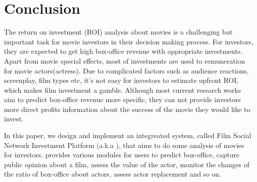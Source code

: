 \section{Conclusion}
\label{sec:conclu}
The return on investment (ROI) analysis about movies is a challenging but important task for movie investors in their decision making process. For investors, they are expected to get high box-office revenue with appropriate investments. Apart from movie special effects, most of investments are used to remuneration for movie actors(actress). Due to complicated factors such as audience reactions, screenplay, film types etc, it's not easy for investors to estimate upfront ROI, which makes film investment a gamble. Although most current research works aim to predict box-office revenue more specific, they can not provide investors more direct profits information about the success of the movie they would like to invest.
\par In this paper, we design and implement an integreated system, called Film Social Network Investment Platform (a.k.a \system), that aims to do some analysis of movies for investors. \system provides various modules for users to predict box-office, capture public opinion about a film, assess the value of the actor, monitor the changes of the ratio of box-office about actors, assess actor replacement and so on.

